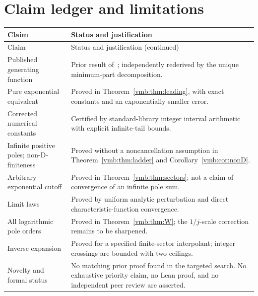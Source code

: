 \documentclass[11pt,a4paper]{article}
\numberwithin{equation}{section}
\theoremstyle{definition}\newtheorem{definition}[theorem]{Definition}
\theoremstyle{remark}\newtheorem{remark}[theorem]{Remark}
\begin{document}
\section{Claim ledger and limitations}
\begin{longtable}{@{}p{}p{}@{}}
\toprule
Claim & Status and justification\\
\midrule
\endfirsthead
\toprule
Claim & Status and justification (continued)\\
\midrule
\endhead
Published generating function & Prior result of~\cite{FRV}; independently
rederived by the unique minimum-part decomposition.\\[3pt]
Pure exponential equivalent & Proved in Theorem~\ref{vmb:thm:leading}, with
exact constants and an exponentially smaller error.\\[3pt]
Corrected numerical constants & Certified by standard-library integer
interval arithmetic with explicit infinite-tail bounds.\\[3pt]
Infinite positive poles; non-D-finiteness & Proved without a
noncancellation assumption in Theorem~\ref{vmb:thm:ladder} and
Corollary~\ref{vmb:cor:nonD}.\\[3pt]
Arbitrary exponential cutoff & Proved in Theorem~\ref{vmb:thm:sectors}; not
a claim of convergence of an infinite pole sum.\\[3pt]
Limit laws & Proved by uniform analytic perturbation and direct
characteristic-function convergence.\\[3pt]
All logarithmic pole orders & Proved in Theorem~\ref{vmb:thm:W}; the
\(1/j\)-scale correction remains to be sharpened.\\[3pt]
Inverse expansion & Proved for a specified finite-sector interpolant;
integer crossings are bounded with two ceilings.\\[3pt]
Novelty and formal status & No matching prior proof found in the targeted
search. No exhaustive priority claim, no Lean proof, and no independent
peer review are asserted.\\
\bottomrule
\end{longtable}

\clearpage
{}
\end{document}
